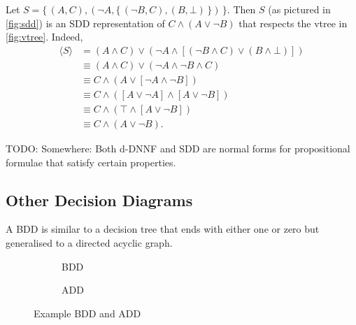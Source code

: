 \begin{example}
  Let $S = \{\, (A, C), (\neg A, \{\, (\neg B, C), (B, \bot) \,\}) \,\}$. Then $S$ (as pictured in \cref{fig:sdd}) is an SDD representation of $C \land (A \lor \neg B)$ that respects the vtree in \cref{fig:vtree}. Indeed,
  \begin{align*}
    \langle S \rangle &= (A \land C) \lor (\neg A \land [(\neg B \land C) \lor (B \land \bot)]) \\
    &\equiv (A \land C) \lor (\neg A \land \neg B \land C) \\
    &\equiv C \land (A \lor [\neg A \land \neg B]) \\
    &\equiv C \land ([A \lor \neg A] \land [A \lor \neg B]) \\
    &\equiv C \land (\top \land [A \lor \neg B]) \\
    &\equiv C \land (A \lor \neg B).
  \end{align*}
\end{example}

TODO: Somewhere: Both d-DNNF and SDD are normal forms for propositional formulae that satisfy certain properties.

\subsection{Other Decision Diagrams}

A BDD is similar to a decision tree that ends with either one or zero but generalised to a directed acyclic graph.

\begin{figure}
  \centering
  \begin{subfigure}{0.49\textwidth}
    \centering
    \caption{BDD}
    \label{fig:bdd}
  \end{subfigure}
  \begin{subfigure}{0.49\textwidth}
    \centering
    \caption{ADD}
    \label{fig:add}
  \end{subfigure} %
  \caption{Example BDD and ADD}
\end{figure}

